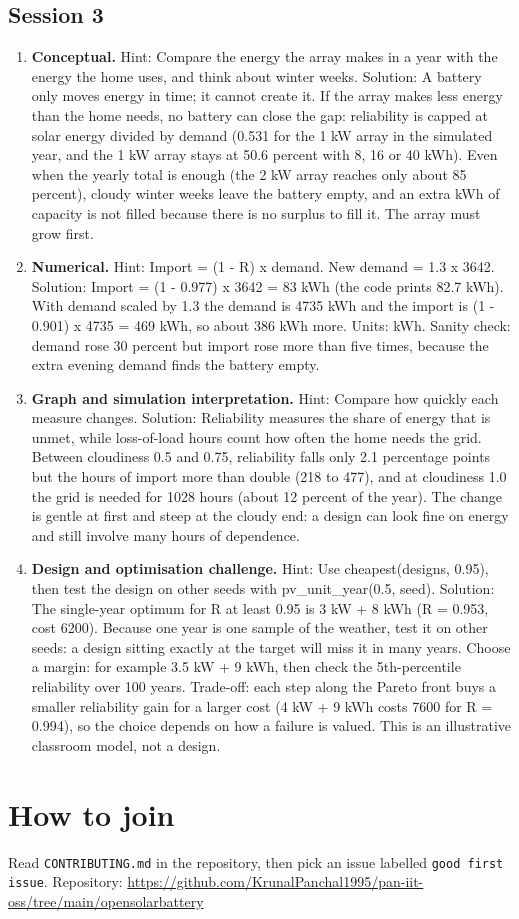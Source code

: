 \documentclass[11pt,a4paper]{article}
\begin{document}
\subsection*{Session 3}
\begin{enumerate}[nosep]
\item \textbf{Conceptual.} Hint: Compare the energy the array makes in a year with the energy the home uses, and think about winter weeks. Solution: A battery only moves energy in time; it cannot create it. If the array makes less energy than the home needs, no battery can close the gap: reliability is capped at solar energy divided by demand (0.531 for the 1 kW array in the simulated year, and the 1 kW array stays at 50.6 percent with 8, 16 or 40 kWh). Even when the yearly total is enough (the 2 kW array reaches only about 85 percent), cloudy winter weeks leave the battery empty, and an extra kWh of capacity is not filled because there is no surplus to fill it. The array must grow first.
\item \textbf{Numerical.} Hint: Import = (1 - R) x demand. New demand = 1.3 x 3642. Solution: Import = (1 - 0.977) x 3642 = 83 kWh (the code prints 82.7 kWh). With demand scaled by 1.3 the demand is 4735 kWh and the import is (1 - 0.901) x 4735 = 469 kWh, so about 386 kWh more. Units: kWh. Sanity check: demand rose 30 percent but import rose more than five times, because the extra evening demand finds the battery empty.
\item \textbf{Graph and simulation interpretation.} Hint: Compare how quickly each measure changes. Solution: Reliability measures the share of energy that is unmet, while loss-of-load hours count how often the home needs the grid. Between cloudiness 0.5 and 0.75, reliability falls only 2.1 percentage points but the hours of import more than double (218 to 477), and at cloudiness 1.0 the grid is needed for 1028 hours (about 12 percent of the year). The change is gentle at first and steep at the cloudy end: a design can look fine on energy and still involve many hours of dependence.
\item \textbf{Design and optimisation challenge.} Hint: Use cheapest(designs, 0.95), then test the design on other seeds with pv\_unit\_year(0.5, seed). Solution: The single-year optimum for R at least 0.95 is 3 kW + 8 kWh (R = 0.953, cost 6200). Because one year is one sample of the weather, test it on other seeds: a design sitting exactly at the target will miss it in many years. Choose a margin: for example 3.5 kW + 9 kWh, then check the 5th-percentile reliability over 100 years. Trade-off: each step along the Pareto front buys a smaller reliability gain for a larger cost (4 kW + 9 kWh costs 7600 for R = 0.994), so the choice depends on how a failure is valued. This is an illustrative classroom model, not a design.
\end{enumerate}

\section{How to join}
Read \texttt{CONTRIBUTING.md} in the repository, then pick an issue labelled \texttt{good first issue}. Repository: \url{https://github.com/KrunalPanchal1995/pan-iit-oss/tree/main/opensolarbattery}
\end{document}
